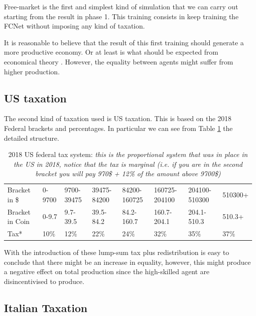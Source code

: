 Free-market is the first and simplest kind of simulation that we can carry out starting from the result in phase 1. This training consists in keep training the FCNet without imposing any kind of taxation. 

It is reasonable to believe that the result of this first training should generate a more productive economy. Or at least is what should be expected from economical theory \cite{atkinson2015lectures}. However, the equality between agents might suffer from higher production.

\subsection{US taxation}

The second kind of taxation used is US taxation. This is based on the 2018 Federal brackets and percentages. In particular we can see from Table \ref{tab:us_tax} the detailed structure. 


\begin{table}[h!]
\linespread{.9}
\begin{adjustbox}{max width=\textwidth}
    \begin{tabular}{llllllll}
        \hline
    Bracket in \$   & 0-9700 & 9700-39475 & 39475-84200 & 84200-160725 & 160725-204100 & 204100-510300 & 510300+ \\
    Bracket in Coin & 0-9.7  & 9.7-39.5   & 39.5-84.2   & 84.2-160.7   & 160.7-204.1   & 204.1-510.3   & 510.3+  \\
    Tax*            & 10\%   & 12\%       & 22\%        & 24\%         & 32\%          & 35\%          & 37\%\\
    \hline
    \end{tabular}
\end{adjustbox}
    \caption[2018 US federal tax system:]%
    {\label{tab:us_tax}2018 US federal tax system: \small \textit{this is the proportional system that was in place in the US in 2018, notice that the tax is marginal (i.e. if you are in the second bracket you will pay 970\$ + 12\% of the amount above 9700\$) }}
\end{table}


With the introduction of these lump-sum tax plus redistribution is easy to conclude that there might be an increase in equality, however, this might produce a negative effect on total production since the high-skilled agent are disincentivised to produce.

\subsection{Italian Taxation}

